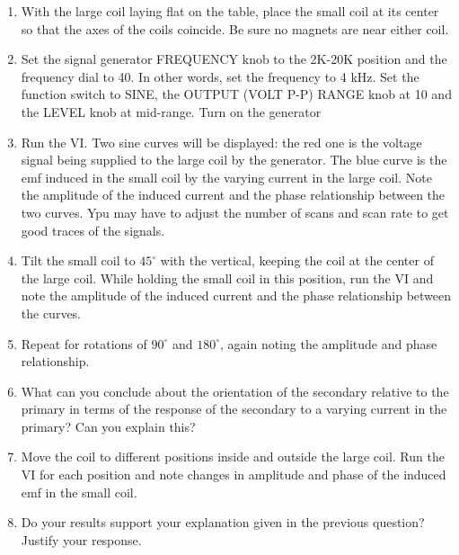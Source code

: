\begin{enumerate}
\item With the large coil laying flat on the table, place the small coil
at its center so that the axes of the coils coincide. Be sure no magnets
are near either coil.
\item Set the signal generator FREQUENCY knob to the 2K-20K position and
the frequency dial to 40. In other words, set the frequency to 4 kHz.
Set the function switch to SINE, the OUTPUT (VOLT P-P) RANGE knob
at 10 and the LEVEL knob at mid-range. Turn on the generator
\item Run the VI. Two sine curves will be displayed: the red one is the
voltage signal being supplied to the large coil by the generator.
The blue curve is the emf induced in the small coil by the varying
current in the large coil. Note the amplitude of the induced current
and the phase relationship between the two curves. Ypu may have to
adjust the number of scans and scan rate to get good traces of the
signals.
\item Tilt the small coil to $45^\circ$ with the vertical, keeping the coil
at the center of the large coil. While holding the small coil in this
position, run the VI and note the amplitude of the induced current
and the phase relationship between the curves.
\item Repeat for rotations of $90^\circ$ and $180^\circ$, again noting the
amplitude and phase relationship. 
\item What can you conclude about the orientation of the secondary relative
to the primary in terms of the response of the secondary to a varying
current in the primary? Can you explain this? \vspace{15mm}

\item Move the coil to different positions inside and outside the large
coil. Run the VI for each position and note changes in amplitude and
phase of the induced emf in the small coil. \vspace{15mm}

\item Do your results support your explanation given in the previous question?
Justify your response.\vspace{15mm}
\end{enumerate}

